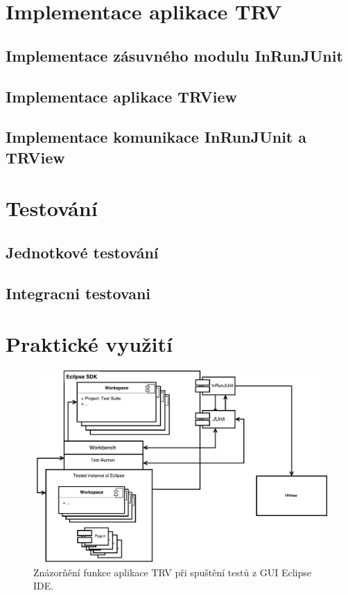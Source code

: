   \section{Implementace aplikace TRV}

    \subsection{Implementace zásuvného modulu InRunJUnit}
    \subsection{Implementace aplikace TRView}
    \subsection{Implementace komunikace InRunJUnit a TRView}
  
  \section{Testování}

    \subsection{Jednotkové testování}
    \subsection{Integracni testovani}

  \section{Praktické využití}

    \begin{figure}[!h]
	\includegraphics[width=\textwidth, center]{obrazky-figures/TRV_run_from_gui.pdf}
	\caption{Znázorňění funkce aplikace TRV při spuštění testů z GUI Eclipse IDE.}
	\label{fig:TRV_run_from_gui}
      \end{figure}

